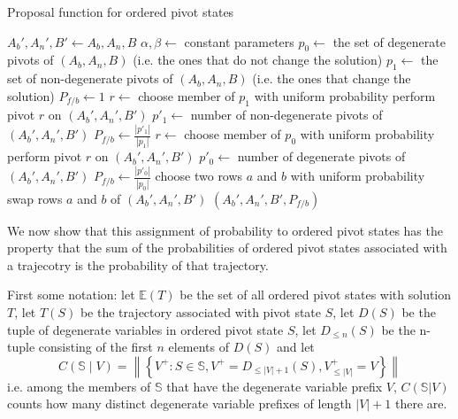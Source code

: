 \documentclass{article}
\begin{document}
\begin{algorithm}
	\caption{Proposal function for ordered pivot states}
	\label{proposal}
	\begin{algorithmic}
		 
		\State $A_b',A_n',B' \leftarrow A_b,A_n,B$
		\State $\alpha, \beta \leftarrow$ constant parameters
		\State $p_0 \leftarrow$ the set of degenerate pivots of $(A_b,A_n,B)$ (i.e. the ones that do not change the solution)
		\State $p_1 \leftarrow$ the set of non-degenerate pivots of $(A_b,A_n,B)$ (i.e. the ones that change the solution)
		\State $P_{f/b} \leftarrow 1$ 
		\State $r \leftarrow$ choose member of $p_1$ with uniform probability
		\State perform pivot $r$ on $(A_b',A_n',B')$
		\State $p'_1 \leftarrow $ number of non-degenerate pivots of $(A_b',A_n',B')$
		\State $P_{f/b} \leftarrow \frac{|p'_1|}{|p_1|}$
		\State $r \leftarrow$ choose member of $p_0$ with uniform probability
		\State perform pivot $r$ on $(A_b',A_n',B')$
		\State $p'_0 \leftarrow $ number of degenerate pivots of $(A_b',A_n',B')$
		\State $P_{f/b} \leftarrow \frac{|p'_0|}{|p_0|}$
		\Else
		\State choose two rows $a$ and $b$ with uniform probability
		\State swap rows $a$ and $b$ of $(A_b',A_n',B')$
		\EndIf
		\State \Return $(A_b',A_n',B',P_{f/b})$
		\EndFunction
	\end{algorithmic}
\end{algorithm}



We now show that this assignment of probability to ordered pivot states has the property that the sum of the probabilities of ordered pivot states associated with a trajecotry is the probability of that trajectory.

First some notation: let $\mathbb{E}(T)$ be the set of all ordered pivot states with solution $T$, let $T(S)$ be the trajectory associated with pivot state $S$, let $D(S)$ be the tuple of degenerate variables in ordered pivot state $S$, let $D_{\le n}(S)$ be the n-tuple consisting of the first $n$ elements of $D(S)$ and let
\begin{equation}
C(\mathbb{S} \mid V) = \left\|\left\{ V^+ :  S \in \mathbb{S}, V^+ = D_{\le |V|+1}(S), V^+_{\le |V|}=V \right\}\right\|
\label{count}
\end{equation}
i.e. among the members of $\mathbb{S}$ that have the degenerate variable prefix $V$, $C(\mathbb{S}|V)$ counts how many distinct degenerate variable prefixes of length $|V|+1$ there are.
\end{document}
